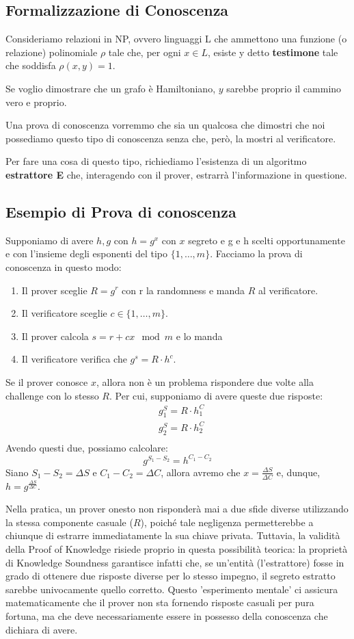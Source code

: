 \subsection{Formalizzazione di Conoscenza}
Consideriamo relazioni in NP, ovvero linguaggi L che ammettono una funzione (o relazione) polinomiale $\rho$ tale che, per ogni $x \in L$, esiste y detto \textbf{testimone} tale che soddisfa $\rho(x,y) = 1$.

Se voglio dimostrare che un grafo è Hamiltoniano, $y$ sarebbe proprio il cammino vero e proprio.

Una prova di conoscenza vorremmo che sia un qualcosa che dimostri che noi possediamo questo tipo di conoscenza senza che, però, la mostri al verificatore.

Per fare una cosa di questo tipo, richiediamo l'esistenza di un algoritmo \textbf{estrattore E} che, interagendo con il prover, estrarrà l'informazione in questione.

\subsection*{Esempio di Prova di conoscenza}
Supponiamo di avere $h,g$ con $h= g^x$ con $x$ segreto e g e h scelti opportunamente e con l'insieme degli esponenti del tipo $\{1, \dots, m\}$. Facciamo la prova di conoscenza in questo modo:
\begin{enumerate}
    \item Il prover sceglie $R = g^r$ con r la randomness e manda $R$ al verificatore.
    \item Il verificatore sceglie $c \in \{1,\dots, m\}$. 
    \item Il prover calcola $s = r+cx \mod m$ e lo manda
    \item Il verificatore verifica che $g^s = R \cdot h^c$.
\end{enumerate}
Se il prover conosce $x$, allora non è un problema rispondere due volte alla challenge con lo stesso $R$. Per cui, supponiamo di avere queste due risposte:
\begin{align*}
    &g^S_{1} = R \cdot h^C_{1}\\
    &g^S_{2} = R \cdot h^C_{2}\\
\end{align*}
Avendo questi due, possiamo calcolare:
\[g^{S_1-S_2} = h^{C_1-C_2}\]
Siano $S_1-S_2 = \Delta S$ e $C_1-C_2 = \Delta C$, allora avremo che $x=\frac{\Delta S}{\Delta C}$ e, dunque, $h = g^{\frac{\Delta S}{\Delta C}}$.

Nella pratica, un prover onesto non risponderà mai a due sfide diverse utilizzando la stessa componente casuale ($R$), poiché tale negligenza permetterebbe a chiunque di estrarre immediatamente la sua chiave privata. Tuttavia, la validità della Proof of Knowledge risiede proprio in questa possibilità teorica: la proprietà di Knowledge Soundness garantisce infatti che, se un'entità (l'estrattore) fosse in grado di ottenere due risposte diverse per lo stesso impegno, il segreto estratto sarebbe univocamente quello corretto. Questo 'esperimento mentale' ci assicura matematicamente che il prover non sta fornendo risposte casuali per pura fortuna, ma che deve necessariamente essere in possesso della conoscenza che dichiara di avere.

